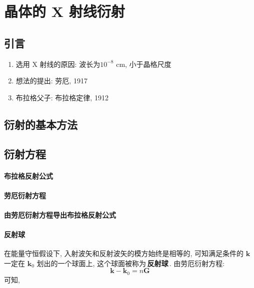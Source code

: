 \section{晶体的 X 射线衍射}
    \subsection{引言}
        \begin{enumerate}
            \item 选用 X 射线的原因: 波长为$10^{-8}$ cm, 小于晶格尺度
            \item 想法的提出: 劳厄, 1917
            \item 布拉格父子: 布拉格定律, 1912
        \end{enumerate}

    \subsection{衍射的基本方法}

    \subsection{衍射方程}
        \paragraph{布拉格反射公式 \\}

        \paragraph{劳厄衍射方程 \\}

        \paragraph{由劳厄衍射方程导出布拉格反射公式 \\}

        \paragraph{反射球 \\}
            \hspace*{2em} 在能量守恒假设下, 入射波矢和反射波矢的模方始终是相等的, 可知满足条件的 $\bm{k}$ 一定在 $\bm{k}_0$ 划出的一个球面上, 这个球面被称为\,\textbf{反射球}\,. 由劳厄衍射方程:
                \begin{equation}
                    \bm{k} - \bm{k}_0 = n \bm{G}
                \end{equation}
            可知, 

